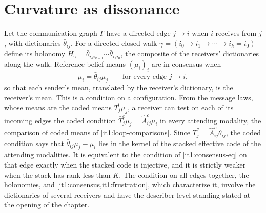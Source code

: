 \section{Curvature as dissonance}
\label{it1:ch-dissonance}

Let the communication graph $\Gamma$ have a directed edge $j\to i$ when $i$ receives from $j$, with dictionaries $\bar\theta_{ij}$. For a directed closed walk $\gamma=(i_0\to i_1\to\cdots\to i_k=i_0)$ define its holonomy $H_\gamma=\bar\theta_{i_ki_{k-1}}\cdots\bar\theta_{i_1i_0}$, the composite of the receivers' dictionaries along the walk. Reference belief means $(\mu_i)_i$ are in consensus when
\begin{equation}
\mu_i=\bar\theta_{ij}\mu_j\qquad\text{for every edge }j\to i,
\label{it1:consensus-eq}
\end{equation}
so that each sender's mean, translated by the receiver's dictionary, is the receiver's mean. This is a condition on a configuration. From the message laws, whose means are the coded means $\bar T_j^c\mu_j$, a receiver can test on each of its incoming edges the coded condition $\bar T_j^c\mu_j=\hat A_{ij}^c\mu_i$ in every attending modality, the comparison of coded means of \cref{it1:loop-comparisons}. Since $\bar T_j^c=\hat A_{ij}^c\bar\theta_{ij}$, the coded condition says that $\bar\theta_{ij}\mu_j-\mu_i$ lies in the kernel of the stacked effective code of the attending modalities. It is equivalent to the condition of \cref{it1:consensus-eq} on that edge exactly when the stacked code is injective, and it is strictly weaker when the stack has rank less than $K$. The condition on all edges together, the holonomies, and \cref{it1:consensus,it1:frustration}, which characterize it, involve the dictionaries of several receivers and have the describer-level standing stated at the opening of the chapter.

